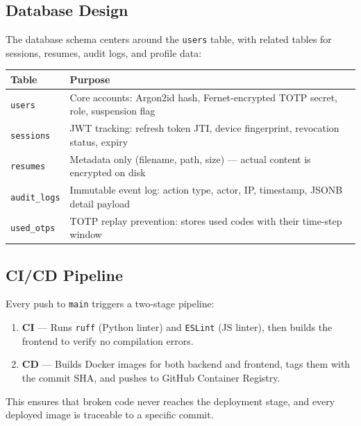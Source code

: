\subsection{Database Design}

The database schema centers around the \texttt{users} table, with related tables for sessions, resumes, audit logs, and profile data:

\begin{table}[H]
\centering
\small
\begin{tabular}{p{3cm} p{10cm}}
    \toprule
    \textbf{Table} & \textbf{Purpose} \\
    \midrule
    \texttt{users} & Core accounts: Argon2id hash, Fernet-encrypted TOTP secret, role, suspension flag \\
    \texttt{sessions} & JWT tracking: refresh token JTI, device fingerprint, revocation status, expiry \\
    \texttt{resumes} & Metadata only (filename, path, size) — actual content is encrypted on disk \\
    \texttt{audit\_logs} & Immutable event log: action type, actor, IP, timestamp, JSONB detail payload \\
    \texttt{used\_otps} & TOTP replay prevention: stores used codes with their time-step window \\
    \bottomrule
\end{tabular}
\end{table}

\subsection{CI/CD Pipeline}

Every push to \texttt{main} triggers a two-stage pipeline:

\begin{enumerate}
    \item \textbf{CI} — Runs \texttt{ruff} (Python linter) and \texttt{ESLint} (JS linter), then builds the frontend to verify no compilation errors.
    \item \textbf{CD} — Builds Docker images for both backend and frontend, tags them with the commit SHA, and pushes to GitHub Container Registry.
\end{enumerate}

This ensures that broken code never reaches the deployment stage, and every deployed image is traceable to a specific commit.
